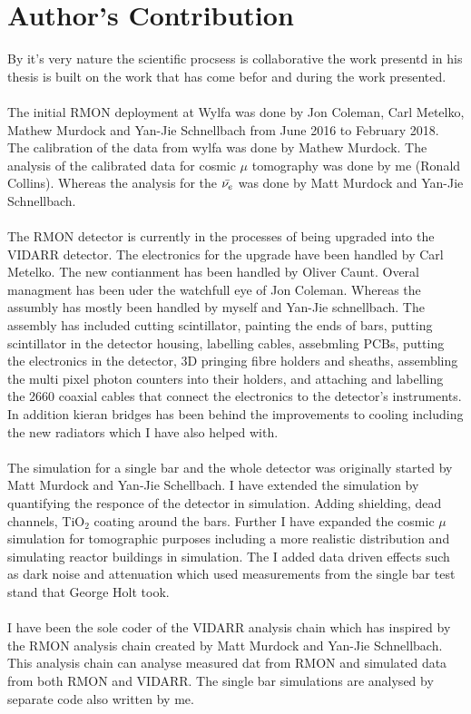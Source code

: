 \chapter{Author's Contribution}

By it's very nature the scientific procsess is collaborative the work presentd in his thesis is built on the work that has come befor and during the work presented. 
\\\\The initial RMON deployment at Wylfa was done by Jon Coleman, Carl Metelko, Mathew Murdock and Yan-Jie Schnellbach from June 2016 to February 2018. The calibration of the data from wylfa was done by Mathew Murdock. The analysis of the calibrated data for cosmic $\mu$ tomography was done by me (Ronald Collins). Whereas the analysis for the $\Bar{\nu_e}$ was done by Matt Murdock and Yan-Jie Schnellbach. 
\\\\The RMON detector is currently in the processes of being upgraded into the VIDARR detector. The electronics for the upgrade have been handled by Carl Metelko. The new contianment has been handled by Oliver Caunt. Overal managment has been uder the watchfull eye of Jon Coleman. Whereas the assumbly has mostly been handled by myself and Yan-Jie schnellbach. The assembly has included cutting scintillator, painting the ends of bars, putting scintillator in the detector housing, labelling cables, assebmling PCBs, putting the electronics in the detector, 3D pringing fibre holders and sheaths, assembling the multi pixel photon counters into their holders, and attaching and labelling the 2660 coaxial cables that connect the electronics to the detector's instruments. In addition kieran bridges has been behind the improvements to cooling including the new radiators which I have also helped with. 
\\\\The simulation for a single bar and the whole detector was originally started by Matt Murdock and Yan-Jie Schellbach.  I have extended the simulation by quantifying the responce of the detector in simulation. Adding shielding, dead channels, TiO$_2$ coating around the bars. Further I have expanded the cosmic $\mu$  simulation for tomographic purposes including a more realistic distribution and simulating reactor buildings in simulation. The I added data driven effects such as dark noise and attenuation which used measurements from the single bar test stand that George Holt took. 
\\\\I have been the sole coder of the VIDARR analysis chain which has inspired by the RMON analysis chain created by Matt Murdock and Yan-Jie Schnellbach. This analysis chain can analyse measured dat from RMON and simulated data from both RMON and VIDARR. The single bar simulations are analysed by separate code also written by me. 